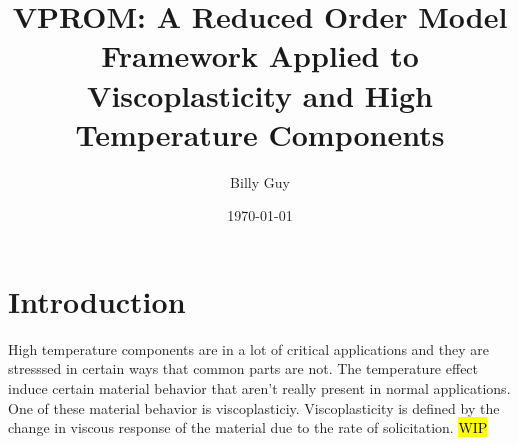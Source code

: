 \documentclass[]{book}
\title{VPROM: A Reduced Order Model Framework Applied to Viscoplasticity and High Temperature Components }
\author{Billy Guy}
\date{\today}
\begin{document}
\maketitle

\frontmatter






\tableofcontents

\mainmatter

\chapter{Introduction}
High temperature components are in a lot of critical applications and they are stresssed in certain ways that common parts are not. The temperature effect induce certain material behavior that aren't really present in normal applications. One of these material behavior is viscoplasticiy. Viscoplasticity is defined by the change in viscous response of the material due to the rate of solicitation. \hl{WIP}





\end{document}
